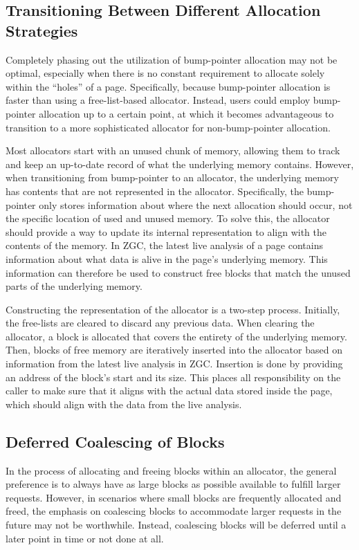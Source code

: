 \subsection{Transitioning Between Different Allocation Strategies}

Completely phasing out the utilization of bump-pointer allocation may not be optimal, especially when there is no constant requirement to allocate solely within the ``holes'' of a page. Specifically, because bump-pointer allocation is faster than using a free-list-based allocator. Instead, users could employ bump-pointer allocation up to a certain point, at which it becomes advantageous to transition to a more sophisticated allocator for non-bump-pointer allocation.

Most allocators start with an unused chunk of memory, allowing them to track and keep an up-to-date record of what the underlying memory contains. However, when transitioning from bump-pointer to an allocator, the underlying memory has contents that are not represented in the allocator. Specifically, the bump-pointer only stores information about where the next allocation should occur, not the specific location of used and unused memory. To solve this, the allocator should provide a way to update its internal representation to align with the contents of the memory. In ZGC, the latest live analysis of a page contains information about what data is alive in the page's underlying memory. This information can therefore be used to construct free blocks that match the unused parts of the underlying memory.

Constructing the representation of the allocator is a two-step process. Initially, the free-lists are cleared to discard any previous data. When clearing the allocator, a block is allocated that covers the entirety of the underlying memory. Then, blocks of free memory are iteratively inserted into the allocator based on information from the latest live analysis in ZGC. Insertion is done by providing an address of the block's start and its size. This places all responsibility on the caller to make sure that it aligns with the actual data stored inside the page, which should align with the data from the live analysis.

\subsection{Deferred Coalescing of Blocks}

In the process of allocating and freeing blocks within an allocator, the general preference is to always have as large blocks as possible available to fulfill larger requests. However, in scenarios where small blocks are frequently allocated and freed, the emphasis on coalescing blocks to accommodate larger requests in the future may not be worthwhile. Instead, coalescing blocks will be deferred until a later point in time or not done at all.

